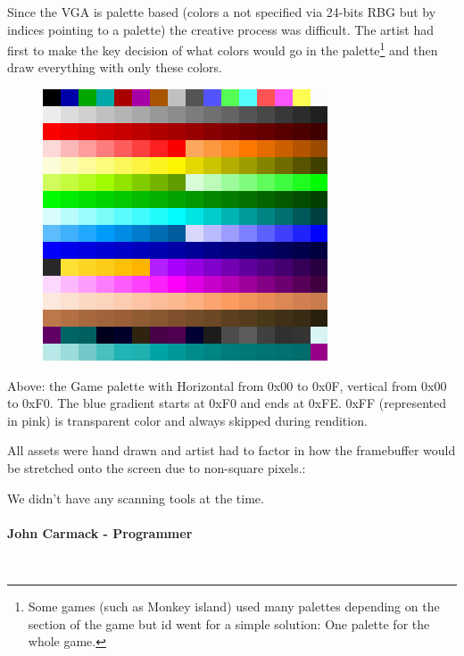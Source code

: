 \documentclass[book.tex]{subfiles}
\begin{document}
Since the VGA is palette based (colors a not specified via 24-bits RBG but by indices pointing to a palette) the creative process was difficult. The artist had first to make the key decision of what colors would go in the palette\footnote{Some games (such as Monkey island) used many palettes depending on the section of the game but id went for a simple solution: One palette for the whole game.} and then draw everything with only these colors.\\
\begin{figure}[H]
  \centering
 \includegraphics[width=\textwidth]{screenshots/palette.png}
 
\end{figure}
Above: the Game palette with Horizontal from 0x00 to 0x0F, vertical from 0x00 to 0xF0. The blue gradient starts at 0xF0 and ends at 0xFE. 0xFF (represented in pink) is transparent color and always skipped during rendition.\\
\par

All assets were hand drawn and artist had to factor in how the framebuffer would be stretched onto the screen due to non-square pixels.:\\
\par
\begin{fancyquotes}
We didn't have any scanning tools at the time.\\
\\
\textbf{John Carmack - Programmer}
\end{fancyquotes}
\\
\end{document}
